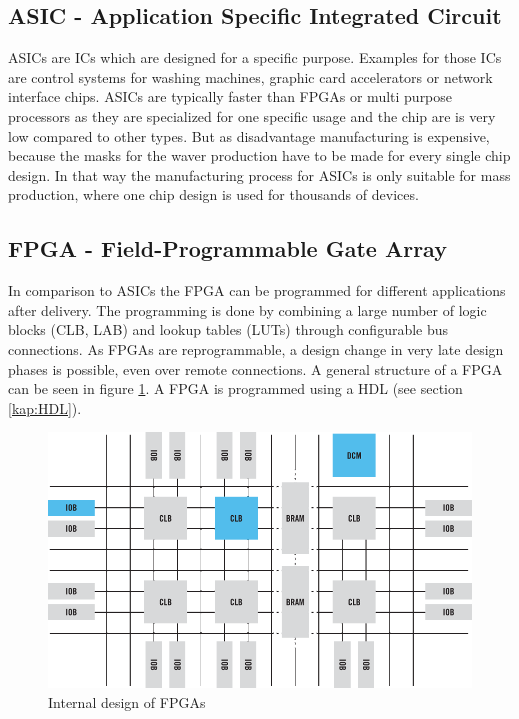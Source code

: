 \subsection{ASIC - Application Specific Integrated Circuit}
ASICs are ICs which are designed for a specific purpose. Examples for those ICs are control systems for washing machines, graphic card accelerators or network interface chips. ASICs are typically faster than FPGAs or multi purpose processors as they are specialized for one specific usage and the chip are is very low compared to other types. But as disadvantage manufacturing is expensive, because the masks for the waver production have to be made for every single chip design. In that way the manufacturing process for ASICs is only suitable for mass production, where one chip design is used for thousands of devices.
\subsection{FPGA - Field-Programmable Gate Array}
In comparison to ASICs the FPGA can be programmed for different applications after delivery. The programming is done by combining a large number of logic blocks (CLB, LAB) and lookup tables (LUTs) through configurable bus connections. As FPGAs are reprogrammable, a design change in very late design phases is possible, even over remote connections. A general structure of a FPGA can be seen in figure \ref{fig:fpgablocksgeneral}. A FPGA is programmed using a HDL (see section \ref{kap:HDL}).
\begin{figure}[htbp]
\begin{center}
\includegraphics[width=14cm,keepaspectratio=true]{bilder/png/fpgablocksgeneral}
\caption{Internal design of FPGAs}
\label{fig:fpgablocksgeneral}
\end{center}
\end{figure}
